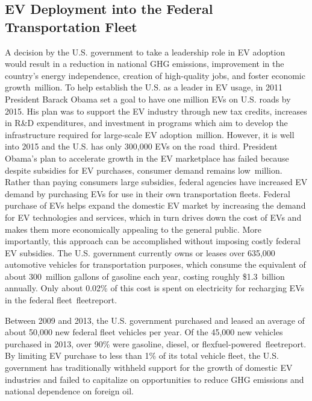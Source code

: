 \subsection{EV Deployment into the Federal Transportation Fleet}

A decision by the U.S. government to take a leadership role in EV adoption would result in a reduction in national GHG emissions, improvement in the country's energy independence, creation of high-quality jobs, and foster economic growth~\cite{eric}{million}. To help establish the U.S. as a leader in EV usage, in 2011 President Barack Obama set a goal to have one million EVs on U.S. roads by 2015. His plan was to support the EV industry through new tax credits, increases in R\&D expenditures, and investment in programs which aim to develop the infrastructure required for large-scale EV adoption~\cite{eric}{million}. However, it is well into 2015 and the U.S. has only 300,000 EVs on the road~\cite{eric}{third}. President Obama's plan to accelerate growth in the EV marketplace has failed because despite subsidies for EV purchases, consumer demand remains low~\cite{eric}{million}. Rather than paying consumers large subsidies, federal agencies have increased EV demand by purchasing EVs for use in their own transportation fleets. Federal purchase of EVs helps expand the domestic EV market by increasing the demand for EV technologies and services, which in turn drives down the cost of EVs and makes them more economically appealing to the general public. More importantly, this approach can be accomplished without imposing costly federal EV subsidies. The U.S. government currently owns or leases over 635,000 automotive vehicles for transportation purposes, which consume the equivalent of about 300~million gallons of gasoline each year, costing roughly \$1.3~billion annually. Only about 0.02\% of this cost is spent on electricity for recharging EVs in the federal fleet~\cite{eric}{fleetreport}. 

Between 2009 and 2013, the U.S. government purchased and leased an average of about 50,000 new federal fleet vehicles per year. Of the 45,000 new vehicles purchased in 2013, over 90\% were gasoline, diesel, or flexfuel-powered~\cite{eric}{fleetreport}. By limiting EV purchase to less than 1\% of its total vehicle fleet, the U.S. government has traditionally withheld support for the growth of domestic EV industries and failed to capitalize on opportunities to reduce GHG emissions and national dependence on foreign oil. 



